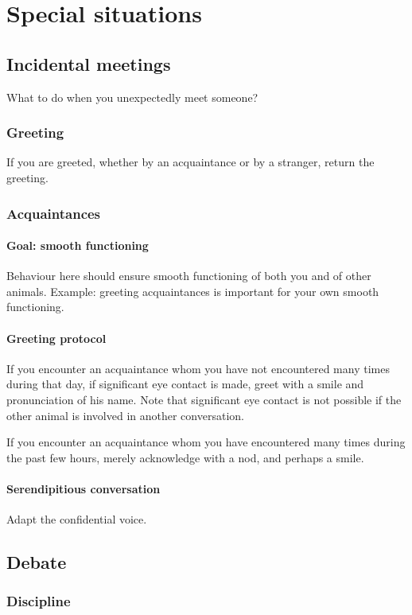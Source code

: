 \documentclass[oneside, article]{memoir}
\begin{document}
\part{Special situations}
\chapter{Incidental meetings}
What to do when you unexpectedly meet someone?

\section{Greeting}
If you are greeted, whether by an acquaintance or by a stranger, return the greeting.

\section{Acquaintances}
\subsection{Goal: smooth functioning}
Behaviour here should ensure smooth functioning of both you and of other animals. Example: greeting acquaintances is important for your own smooth functioning.

\subsection{Greeting protocol}
If you encounter an acquaintance whom you have not encountered many times during that day, if significant eye contact is made, greet with a smile and pronunciation of his name. Note that significant eye contact is not possible if the other animal is involved in another conversation.

If you encounter an acquaintance whom you have encountered many times during the past few hours, merely acknowledge with a nod, and perhaps a smile.

\subsection{Serendipitious conversation}
Adapt the confidential voice.

\chapter{Debate}
\section{Discipline}
\end{document}
